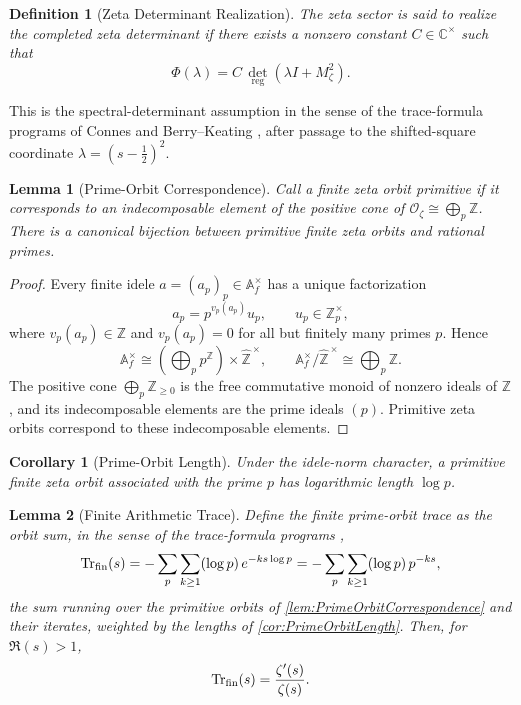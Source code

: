 \documentclass[pdflatex,sn-mathphys-num]{sn-jnl}
\theoremstyle{thmstyleone}
\newtheorem{lemma}[lemma]{Lemma}
\newtheorem{corollary}[corollary]{Corollary}
\theoremstyle{thmstylethree}%
\newtheorem{definition}[definition]{Definition}
\theoremstyle{thmstyletwo}%
\begin{document}
\begin{definition}[Zeta Determinant Realization]
\label{def:ZetaDeterminant}
The zeta sector is said to realize the completed zeta determinant if there
exists a nonzero constant \(C\in\mathbb C^\times\) such that
\[
  \Phi(\lambda)
  =
  C\,\det_{\mathrm{reg}}\left(\lambda I+M_\zeta^2\right).
\]
\end{definition}

This is the spectral-determinant assumption in the sense of the trace-formula
programs of Connes and Berry--Keating
\cite{Connes1999,BerryKeating1999}, after passage to the shifted-square
coordinate \(\lambda=(s-\frac12)^2\).

\begin{lemma}[Prime-Orbit Correspondence]
\label{lem:PrimeOrbitCorrespondence}
Call a finite zeta orbit \emph{primitive} if it corresponds to an
indecomposable element of the positive cone of
\(\mathcal O_{\zeta}\cong\bigoplus_p\mathbb Z\). There is a canonical
bijection between primitive finite zeta orbits and rational primes.
\end{lemma}

\begin{proof}
Every finite idele \(a=(a_p)_p\in\mathbb A_f^\times\) has a unique
factorization \cite{Tate1967}
\[
  a_p=p^{v_p(a_p)}u_p,
  \qquad
  u_p\in\mathbb Z_p^\times,
\]
where \(v_p(a_p)\in\mathbb Z\) and \(v_p(a_p)=0\) for all but finitely many
primes \(p\). Hence
\[
  \mathbb A_f^\times
  \cong
  \left(\bigoplus_p p^{\mathbb Z}\right)
  \times
  \widehat{\mathbb Z}^{\,\times},
  \qquad
  \mathbb A_f^\times/\widehat{\mathbb Z}^{\,\times}
  \cong
  \bigoplus_p\mathbb Z.
\]
The positive cone \(\bigoplus_p\mathbb Z_{\ge0}\) is the free commutative monoid
of nonzero ideals of \(\mathbb Z\), and its indecomposable elements are the
prime ideals \((p)\). Primitive zeta orbits correspond to these
indecomposable elements.
\end{proof}

\begin{corollary}[Prime-Orbit Length]
\label{cor:PrimeOrbitLength}
Under the idele-norm character, a primitive finite zeta orbit associated with
the prime \(p\) has logarithmic length \(\log p\).
\end{corollary}

\begin{lemma}[Finite Arithmetic Trace]
\label{lem:FiniteArithmeticTrace}
Define the finite prime-orbit trace as the orbit sum, in the sense of the
trace-formula programs \cite{Connes1999},
\[
  \operatorname{Tr}_{\mathrm{fin}}(s)
  =
  -\sum_p\sum_{k\ge1}(\log p)\,e^{-ks\log p}
  =
  -\sum_p\sum_{k\ge1}(\log p)\,p^{-ks},
\]
the sum running over the primitive orbits of
\autoref{lem:PrimeOrbitCorrespondence} and their iterates, weighted by the
lengths of \autoref{cor:PrimeOrbitLength}. Then, for \(\Re(s)>1\),
\[
  \operatorname{Tr}_{\mathrm{fin}}(s)
  =
  \frac{\zeta'(s)}{\zeta(s)}.
\]
\end{lemma}
\end{document}
